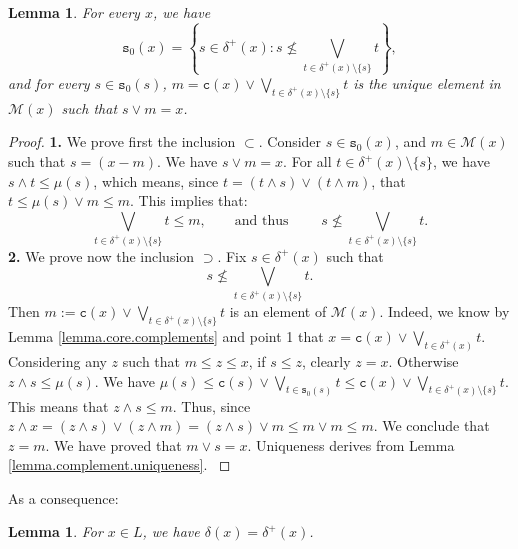\documentclass{article}
\newtheorem{lemma}[theorem]{Lemma}
\begin{document}

\begin{lemma}\label{lemma.completeness}
     For every $x$, we have 
    \[\texttt{s}_0(x) = \left\{s \in {\delta}^+(x) : s \not \le \bigvee_{t \in \delta^+(x) \setminus \{s\}}t\right\},\]
    and for every $s \in \texttt{s}_0(s)$, $m=\texttt{c}(x) \vee \bigvee_{t \in \delta^+(x) \setminus \{s\}}t$ is the unique element in $\mathcal{M}(x)$ such that $s \vee m = x$.
\end{lemma}

\begin{proof}
    \textbf{1.} We prove first the inclusion $\subset$. Consider $s \in \texttt{s}_0(x)$, and $m \in \mathcal{M}(x)$ such that $s = (x-m)$. We have $s \vee m = x$.
    For all $t \in \delta^+(x) \setminus \{s\}$, we have $s \wedge t \le \mu(s)$, which means, 
    since $t = (t \wedge s) \vee (t \wedge m)$, 
    that $t \le \mu(s) \vee m \le m$. This implies that: 
    \[\bigvee_{t \in \delta^+(x) \setminus \{s\}}t \le m, \qquad \text{and thus }\qquad s \not \le \bigvee_{t \in \delta^+(x) \setminus \{s\}}t.\]
    {\textbf{2.} We prove now the inclusion $\supset$. Fix $s \in \delta^+(x)$ such that \[s \not \le \bigvee_{t \in \delta^+(x) \setminus \{s\}}t.\]
    Then $m:= \texttt{c}(x) \vee \bigvee_{t \in \delta^+(x) \setminus \{s\}}t$ is an element of $\mathcal{M}(x)$. Indeed, we know by Lemma \ref{lemma.core.complements} and point 1 that $x = \texttt{c}(x) \vee \bigvee_{t \in \delta^+(x)} t$. 
    Considering any $z$ such that $m \le z \le x$, if $s \le z$, clearly $z = x$. Otherwise $z \wedge s \le \mu(s)$. We have $\mu(s) \le \texttt{c}(s) \vee \bigvee_{t \in \texttt{s}_0(s)} t \le \texttt{c}(x) \vee \bigvee_{t \in \delta^+(x) \setminus \{s\}}t$.
    This means that $z \wedge s \le m$.
    Thus, since $z \wedge x = (z \wedge s) \vee (z \wedge m) = (z\wedge s) \vee m \le m \vee m \le m$.
    We conclude that $z = m$. 
    {We have proved that $m \vee s = x$. Uniqueness derives from Lemma \ref{lemma.complement.uniqueness}}.
    }
\end{proof}

As a consequence:

\begin{lemma}
    For $x\in L$, we have $\delta(x) = \delta^+(x)$.
\end{lemma}
\end{document}
